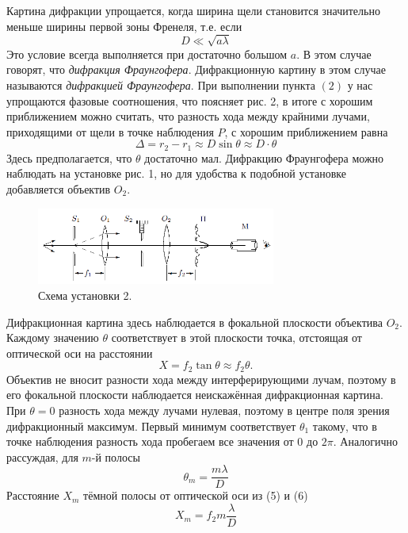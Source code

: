 \documentclass[a4paper, 12pt]{article}%
\begin{document}
	Картина дифракции упрощается, когда ширина щели становится значительно меньше ширины первой зоны Френеля, т.е. если 
	\begin{equation}
	D \ll\sqrt{a \lambda} 
	\end{equation}	
	Это условие всегда выполняется при достаточно большом $a$. В этом случае говорят, что \textit{дифракция Фраунгофера}. Дифракционную картину в этом случае называются \textit{дифракцией Фраунгофера}. При выполнении пункта $(2)$ у нас упрощаются фазовые соотношения, что поясняет рис. 2, в итоге с хорошим приближением можно считать, что разность хода между крайними лучами, приходящими от щели в точке наблюдения $P$, с хорошим приближением равна 
	\begin{equation}
	\Delta = r_2 - r_1 \approx D \sin \theta \approx D \cdot \theta
	\end{equation}
	Здесь предполагается, что $\theta$ достаточно мал.
	Дифракцию Фраунгофера можно наблюдать на установке рис. 1, но для удобства к подобной установке добавляется объектив $O_2$.
	
	\begin{figure}[h]
		\includegraphics[width = 0.7\textwidth]{images/431-4.png}
		\centering
		\caption{Схема установки 2.}
	\end{figure}
	Дифракционная картина здесь наблюдается в фокальной плоскости объектива $O_2$. Каждому значению $\theta$ соответствует в этой плоскости точка, отстоящая от оптической оси на расстоянии 
	\begin{equation}
	X = f_2 \tan \theta \approx f_2 \theta.
	\end{equation}
	Объектив не вносит разности хода между интерферирующими лучам, поэтому в его фокальной плоскости наблюдается неискажённая дифракционная картина. При $\theta = 0$ разность хода между лучами нулевая, поэтому в центре поля зрения дифракционный максимум. Первый минимум соответствует $\theta_1$ такому, что в точке наблюдения разность хода пробегаем все значения от 0 до $2\pi$. Аналогично рассуждая, для $m$-й полосы
	\begin{equation}
	\theta_m = \frac{m \lambda}{D}
	\end{equation}
	Расстояние $X_m$ тёмной полосы от оптической оси из (5) и (6)
	\begin{equation}
	X_m = f_2m\frac{\lambda}{D}
	\end{equation}
\end{document}
